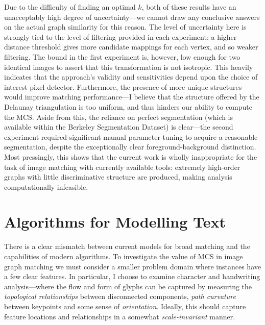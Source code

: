 \documentclass{mpaper}
\begin{document}
\noindent Due to the difficulty of finding an optimal $k$, both of these results have an unacceptably high degree of uncertainty---we cannot draw any conclusive answers on the actual graph similarity for this reason.
The level of uncertainty here is strongly tied to the level of filtering provided in each experiment: a higher distance threshold gives more candidate mappings for each vertex, and so weaker filtering.
The bound in the first experiment is, however, low enough for two identical images to assert that this transformation is not isotropic.
This heavily indicates that the approach's validity and sensitivities depend upon the choice of interest pixel detector.
Furthermore, the presence of more unique structures would improve matching performance---I believe that the structure offered by the Delaunay triangulation is too uniform, and thus hinders our ability to compute the MCS.
Aside from this, the reliance on perfect segmentation (which is available within the Berkeley Segmentation Dataset) is clear---the second experiment required significant manual parameter tuning to acquire a reasonable segmentation, despite the exceptionally clear foreground-background distinction.
Most pressingly, this shows that the current work is wholly inappropriate for the task of image matching with currently available tools: extremely high-order graphs with little discriminative structure are produced, making analysis computationally infeasible.

\section{Algorithms for Modelling Text}
\label{sec:algorithm}

There is a clear mismatch between current models for broad matching and the capabilities of modern algorithms.
To investigate the value of MCS in image graph matching we must consider a smaller problem domain where instances have a few clear features.
In particular, I choose to examine character and handwriting analysis---where the flow and form of glyphs can be captured by measuring the \emph{topological relationships} between disconnected components, \emph{path curvature} between keypoints and some sense of \emph{orientation}.
Ideally, this should capture feature locations and relationships in a somewhat \emph{scale-invariant} manner.
\end{document}
